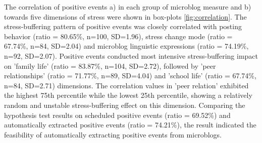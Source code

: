 The correlation of positive events a) in each group of microblog measure
and b) towards five dimensions of stress
were shown in box-plots \ref{fig:correlation}.
The stress-buffering pattern of positive events
was closely correlated with posting behavior (ratio = 80.65\%, n=100, SD=1.96),
stress change mode (ratio = 67.74\%, n=84, SD=2.04) and microblog linguistic expressions (ratio = 74.19\%, n=92, SD=2.07).
Positive events conducted most intensive stress-buffering impact on 'family life' (ratio = 83.87\%, n=104, SD=2.72),
followed by 'peer relationships' (ratio = 71.77\%, n=89, SD=4.04) and 'school life' (ratio = 67.74\%, n=84, SD=2.71) dimensions.
The correlation values in 'peer relation'
exhibited the highest 75th percentile while the lowest 25th percentile,
showing a relatively random and unstable stress-buffering effect on this dimension.
Comparing the hypothesis test results on scheduled positive events (ratio = 69.52\%)
and automatically extracted positive events (ratio = 74.21\%),
the result indicated the feasibility of automatically extracting positive events from microblogs.

\begin{table}[H]
\begin{center}
\caption{\small{Quantify the impact of scheduled positive school events using KTS (the KNN-based two sample method adopted in this research) and baseline method.}}
\label{tab:schedule}
\end{center}
\end{table}


